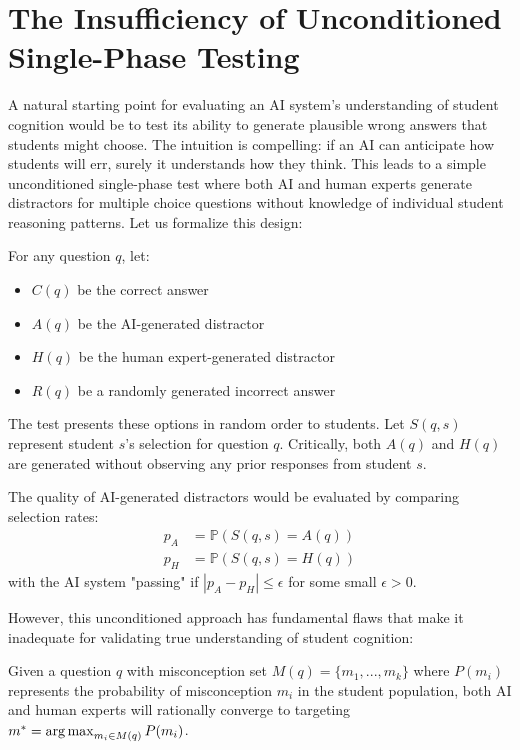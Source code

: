 \section{The Insufficiency of Unconditioned Single-Phase Testing}

A natural starting point for evaluating an AI system's understanding of student cognition would be to test its ability to generate plausible wrong answers that students might choose. The intuition is compelling: if an AI can anticipate how students will err, surely it understands how they think. This leads to a simple unconditioned single-phase test where both AI and human experts generate distractors for multiple choice questions without knowledge of individual student reasoning patterns. Let us formalize this design:

\begin{definition}
For any question $q$, let:
\begin{itemize}
   \item $C(q)$ be the correct answer
   \item $A(q)$ be the AI-generated distractor 
   \item $H(q)$ be the human expert-generated distractor
   \item $R(q)$ be a randomly generated incorrect answer
\end{itemize}

The test presents these options in random order to students. Let $S(q,s)$ represent student $s$'s selection for question $q$. Critically, both $A(q)$ and $H(q)$ are generated without observing any prior responses from student $s$.
\end{definition}

\begin{definition}
The quality of AI-generated distractors would be evaluated by comparing selection rates:
\begin{align*}
p_A &= \mathbb{P}(S(q,s) = A(q)) \\
p_H &= \mathbb{P}(S(q,s) = H(q))
\end{align*}
with the AI system "passing" if $|p_A - p_H| \leq \epsilon$ for some small $\epsilon > 0$.
\end{definition}

However, this unconditioned approach has fundamental flaws that make it inadequate for validating true understanding of student cognition:

\begin{theorem}
Given a question $q$ with misconception set $M(q) = \{m_1,...,m_k\}$ where $P(m_i)$ represents the probability of misconception $m_i$ in the student population, both AI and human experts will rationally converge to targeting $m^* = \operatorname*{arg\,max}_{m_i \in M(q)} P(m_i)$.
\end{theorem}

